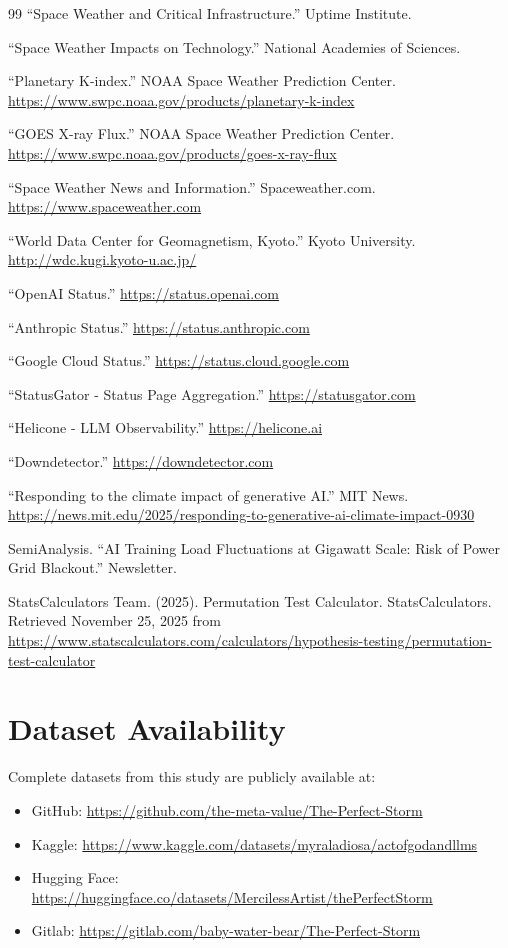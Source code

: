 \documentclass[11pt,a4paper]{article}
\begin{document}
\begin{thebibliography}{99}
 ``Space Weather and Critical Infrastructure.'' Uptime Institute.

 ``Space Weather Impacts on Technology.'' National Academies of Sciences.

 ``Planetary K-index.'' NOAA Space Weather Prediction Center.
\url{https://www.swpc.noaa.gov/products/planetary-k-index}

 ``GOES X-ray Flux.'' NOAA Space Weather Prediction Center.
\url{https://www.swpc.noaa.gov/products/goes-x-ray-flux}

 ``Space Weather News and Information.'' Spaceweather.com.
\url{https://www.spaceweather.com}

 ``World Data Center for Geomagnetism, Kyoto.'' Kyoto University.
\url{http://wdc.kugi.kyoto-u.ac.jp/}

 ``OpenAI Status.'' \url{https://status.openai.com}

 ``Anthropic Status.'' \url{https://status.anthropic.com}

 ``Google Cloud Status.'' \url{https://status.cloud.google.com}

 ``StatusGator - Status Page Aggregation.'' \url{https://statusgator.com}

 ``Helicone - LLM Observability.'' \url{https://helicone.ai}

 ``Downdetector.'' \url{https://downdetector.com}

 ``Responding to the climate impact of generative AI.'' MIT News.
\url{https://news.mit.edu/2025/responding-to-generative-ai-climate-impact-0930}

 SemiAnalysis.
``AI Training Load Fluctuations at Gigawatt Scale: Risk of Power Grid Blackout.'' Newsletter.

 StatsCalculators Team. (2025). Permutation Test Calculator. StatsCalculators.
Retrieved November 25, 2025 from \url{https://www.statscalculators.com/calculators/hypothesis-testing/permutation-test-calculator}

\end{thebibliography}

\section*{Dataset Availability}
Complete datasets from this study are publicly available at:
\begin{itemize}
\item GitHub: \url{https://github.com/the-meta-value/The-Perfect-Storm}
\item Kaggle: \url{https://www.kaggle.com/datasets/myraladiosa/actofgodandllms}
\item Hugging Face: \url{https://huggingface.co/datasets/MercilessArtist/thePerfectStorm}
\item Gitlab: \url{https://gitlab.com/baby-water-bear/The-Perfect-Storm}
\end{itemize}
\end{document}
